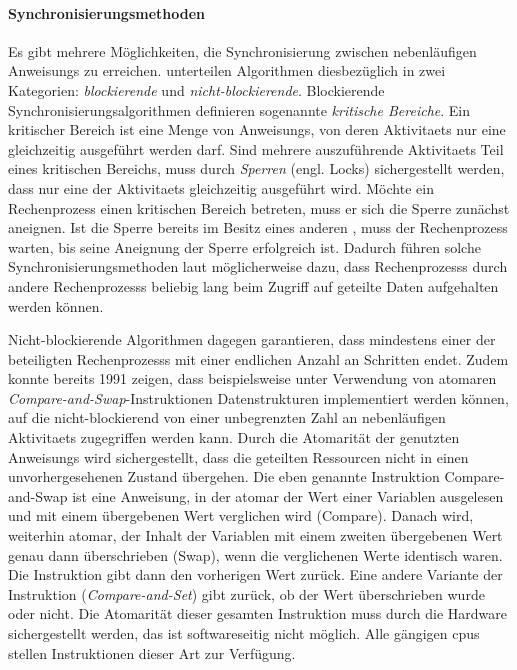 \paragraph{Synchronisierungsmethoden} Es gibt mehrere Möglichkeiten, die Synchronisierung zwischen nebenläufigen \glspl{Anweisung} zu erreichen. \textcite{Michael1996} unterteilen Algorithmen diesbezüglich in zwei Kategorien: \emph{blockierende} und \emph{nicht-blockierende}. Blockierende Synchronisierungsalgorithmen definieren sogenannte \emph{kritische Bereiche}. Ein kritischer Bereich ist eine Menge von \glspl{Anweisung}, von deren \glspl{Aktivitaet} nur eine gleichzeitig ausgeführt werden darf. Sind mehrere auszuführende \glspl{Aktivitaet} Teil eines kritischen Bereichs, muss durch \emph{Sperren} (engl. Locks) sichergestellt werden, dass nur eine der \glspl{Aktivitaet} gleichzeitig ausgeführt wird. Möchte ein \gls{Rechenprozess} einen kritischen Bereich betreten, muss er sich die Sperre zunächst aneignen. Ist die Sperre bereits im Besitz eines anderen , muss der \gls{Rechenprozess} warten, bis seine Aneignung der Sperre erfolgreich ist. Dadurch führen solche Synchronisierungsmethoden laut \textcite{Michael1996} möglicherweise dazu, dass \glspl{Rechenprozess} durch andere \glspl{Rechenprozess} beliebig lang beim Zugriff auf geteilte Daten aufgehalten werden können.

Nicht-blockierende Algorithmen dagegen garantieren, dass mindestens einer der beteiligten \glspl{Rechenprozess} mit einer endlichen Anzahl an Schritten endet. Zudem konnte \textcite{Herlihy1991} bereits 1991 zeigen, dass beispielsweise unter Verwendung von atomaren \emph{Compare-and-Swap}-Instruktionen Datenstrukturen implementiert werden können, auf die nicht-blockierend von einer unbegrenzten Zahl an nebenläufigen \glspl{Aktivitaet} zugegriffen werden kann. Durch die Atomarität der genutzten \glspl{Anweisung} wird sichergestellt, dass die geteilten Ressourcen nicht in einen unvorhergesehenen Zustand übergehen. Die eben genannte Instruktion Compare-and-Swap ist eine \gls{Anweisung}, in der atomar der Wert einer Variablen ausgelesen und mit einem übergebenen Wert verglichen wird (Compare). Danach wird, weiterhin atomar, der Inhalt der Variablen mit einem zweiten übergebenen Wert genau dann überschrieben (Swap), wenn die verglichenen Werte identisch waren. Die Instruktion gibt dann den vorherigen Wert zurück. Eine andere Variante der Instruktion (\emph{Compare-and-Set}) gibt zurück, ob der Wert überschrieben wurde oder nicht. Die Atomarität dieser gesamten Instruktion muss durch die Hardware sichergestellt werden, das ist softwareseitig nicht möglich. Alle gängigen \acp{cpu} stellen Instruktionen dieser Art zur Verfügung.
